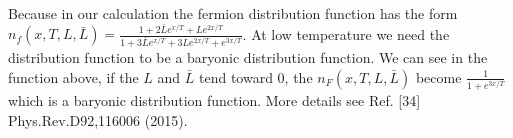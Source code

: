 \documentclass[aps,article,author-year,notitlepage,showpacs]{revtex4-1}
\begin{document}
\begin{enumerate}[1.]
Because in our calculation the fermion distribution function has the form $n_f(x,T,L,\bar{L})=\frac{1+2\bar{L}e^{x/T}+Le^{2x/T}}{1+3\bar{L}e^{x/T}+3Le^{2x/T}+e^{3x/T}}$. At low temperature we need the distribution function to be a baryonic distribution function. We can see in the function above, if the $L$ and $\bar{L}$ tend toward 0, the $n_F(x,T,L,\bar{L})$ become $\frac{1}{1+e^{3x/T}}$ which is a baryonic distribution function. More details see Ref. [34] Phys.Rev.D92,116006 (2015). 

\end{enumerate}
\end{document}

